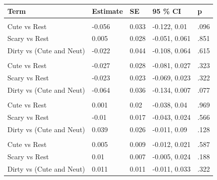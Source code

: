 \documentclass[
  man,
  longtable,
  nolmodern,
  notxfonts,
  notimes,
  colorlinks=true,linkcolor=blue,citecolor=blue,urlcolor=blue]{apa7}
\begin{document}
\begin{table}

{\caption{{Orthogonal contrasts regression analysis for free recall
memory tasks.}{\label{tbl-contrasts-freerecall}}}
\vspace{-20pt}}

\begin{longtable*}[t]{lllll}
\toprule
Term & Estimate & SE & 95 \% CI & p\\
\midrule
\addlinespace[0.3em]
\\
\hspace{1em}Cute vs Rest & -0.056 & 0.033 & -0.122, 0.01 & .096\\
\hspace{1em}Scary vs Rest & 0.005 & 0.028 & -0.051, 0.061 & .851\\
\hspace{1em}Dirty vs (Cute and Neut) & -0.022 & 0.044 & -0.108, 0.064 & .615\\
\addlinespace[0.3em]
\\
\hspace{1em}Cute vs Rest & -0.027 & 0.028 & -0.081, 0.027 & .323\\
\hspace{1em}Scary vs Rest & -0.023 & 0.023 & -0.069, 0.023 & .322\\
\hspace{1em}Dirty vs (Cute and Neut) & -0.064 & 0.036 & -0.134, 0.007 & .077\\
\addlinespace[0.3em]
\\
\hspace{1em}Cute vs Rest & 0.001 & 0.02 & -0.038, 0.04 & .969\\
\hspace{1em}Scary vs Rest & -0.01 & 0.017 & -0.043, 0.024 & .566\\
\hspace{1em}Dirty vs (Cute and Neut) & 0.039 & 0.026 & -0.011, 0.09 & .128\\
\addlinespace[0.3em]
\\
\hspace{1em}Cute vs Rest & 0.005 & 0.009 & -0.012, 0.021 & .587\\
\hspace{1em}Scary vs Rest & 0.01 & 0.007 & -0.005, 0.024 & .188\\
\hspace{1em}Dirty vs (Cute and Neut) & 0.011 & 0.011 & -0.011, 0.033 & .322\\
\bottomrule
\end{longtable*}

\end{table}
\end{document}
